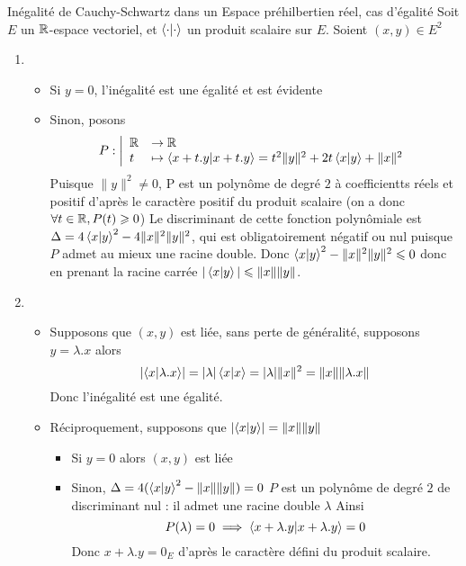 \documentclass{article}
\renewenvironment{question_kholle}[2][ ]
{
	\subsection{\texorpdfstring{#2}{}}
	\notblank{#1}
	{
		\noindent #1
		\bigbreak
	}
	{}
	\begin{proof}
}
{
	\end{proof}
}
\begin{document}
\begin{question_kholle}{Inégalité de Cauchy-Schwartz dans un Espace préhilbertien réel, cas d'égalité}
	Soit $E$ un $\mathbb R$-espace vectoriel, et $\braket{ \cdot | \cdot  }$ un produit scalaire sur $E$.
	Soient $(x, y) \in E^{2}$
	\begin{enumerate}
		\item \begin{itemize}[label=$\star$]
			\item Si $y=0$, l'inégalité est une égalité et est évidente
			\item Sinon, posons
			$$
			P:\left|\begin{array}{ll} \mathbb R &\to \mathbb R \\ t &\mapsto \braket{ x+t.y | x+t.y } = t^{2} \|y\|^{2} + 2 t \braket{ x | y }  + \|x\|^{2} \end{array}\right.
			$$
			Puisque $\|y\|^{2} \neq 0$, P est un polynôme de degré $2$ à coefficientts réels et positif d'après le caractère positif du produit scalaire (on a donc $\forall t \in \mathbb R, P(t)\geqslant 0$)
			Le discriminant de cette fonction polynômiale est $\Delta = 4 \braket{ x | y }^{2} - 4 \|x\|^{2}\|y\|^{2}$, qui est obligatoirement négatif ou nul puisque $P$ admet au mieux une racine double.
			Donc $\braket{ x | y }^{2} - \|x\|^{2}\|y\|^{2} \leqslant 0$ donc en prenant la racine carrée $|\braket{ x | y }| \leqslant \|x\|\|y\|$.
		\end{itemize}
		\item \begin{itemize}[label=$\star$]
			\item Supposons que $(x, y)$ est liée, sans perte de généralité, supposons $y = \lambda.x$ alors
			$$
			\lvert \braket{ x | \lambda.x } \rvert  = \lvert  \lambda \rvert  \braket{ x | x }  = \lvert  \lambda \rvert  \|x\|^{2} = \| x \| \| \lambda.x\|
			$$
			Donc l'inégalité est une égalité.
			
			\item Réciproquement, supposons que $\lvert  \braket{ x | y } \rvert = \| x\| \| y\|$
			\begin{itemize}
				\item Si $y = 0$ alors $(x, y)$ est liée
				\item Sinon, $\Delta = 4(\braket{ x | y }^{2} - \|x\|\|y\|) = 0$
				$P$ est un polynôme de degré $2$ de discriminant nul : il admet une racine double $\lambda$
				Ainsi
				$$
				P(\lambda) = 0 \implies \braket{ x+\lambda.y | x+\lambda.y } = 0
				$$
				Donc $x+\lambda .y = 0_{E}$ d'après le caractère défini du produit scalaire.
			\end{itemize}
		\end{itemize}
	\end{enumerate}
\end{question_kholle}
\end{document}
